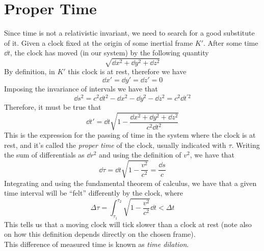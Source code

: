 \documentclass[../admech.tex]{subfiles}
\begin{document}
\section{Proper Time}
Since time is not a relativistic invariant, we need to search for a good substitute of it. Given a clock fixed at the origin of some inertial frame $K'$. After some time $\dd t$, the clock has moved (in our system) by the following quantity
\begin{equation*}
	\sqrt{\dd x^2+\dd y^2+\dd z^2}
\end{equation*}
By definition, in $K'$ this clock is at rest, therefore we have
\begin{equation*}
	\dd x'=\dd y'=\dd z'=0
\end{equation*}
Imposing the invariance of intervals we have that
\begin{equation}
	\dd s^2=c^2\dd t^2-\dd x^2-\dd y^2-\dd z^2=c^2\dd t^{'2}
	\label{eq:invclock}
\end{equation}
Therefore, it must be true that
\begin{equation}
	\dd t'=\dd t\sqrt{1-\frac{\dd x^2+\dd y^2+\dd z^2}{c^2\dd t^2}}
	\label{eq:proptime}
\end{equation}
This is the expression for the passing of time in the system where the clock is at rest, and it's called the \emph{proper time} of the clock, usually indicated with $\tau$. Writing the sum of differentials as $\dd r^2$ and using the definition of $v^2$, we have that
\begin{equation}
	\dd\tau=\dd t\sqrt{1-\frac{v^2}{c^2}}=\frac{\dd s}{c}
	\label{eq:diffprpot}
\end{equation}
Integrating and using the fundamental theorem of calculus, we have that a given time interval will be ``felt'' differently by the clock, where
\begin{equation}
	\Delta\tau=\int_{\tau_1}^{\tau_2}\sqrt{1-\frac{v^2}{c^2}}\dd t<\Delta t
	\label{eq:proptimeint}
\end{equation}
This tells us that a moving clock will tick slower than a clock at rest (note also on how this definition depends directly on the chosen frame).\\
This difference of measured time is known as \emph{time dilation}.
\end{document}
